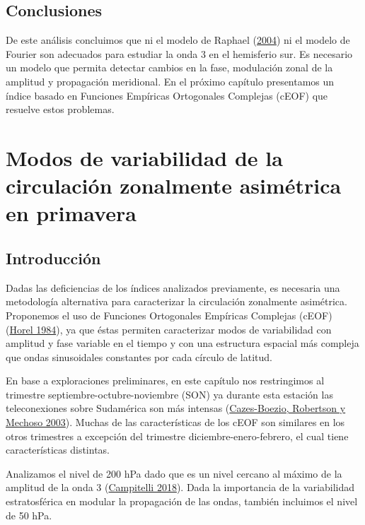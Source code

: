 \documentclass[12pt,oneside,a4paper]{reedthesis}
\begin{document}
\hypertarget{conclusiones}{%
\section{Conclusiones}\label{conclusiones}}

De este análisis concluimos que ni el modelo de Raphael (\protect\hyperlink{ref-raphael2004}{2004}) ni el modelo de Fourier son adecuados para estudiar la onda 3 en el hemisferio sur.
Es necesario un modelo que permita detectar cambios en la fase, modulación zonal de la amplitud y propagación meridional.
En el próximo capítulo presentamos un índice basado en Funciones Empíricas Ortogonales Complejas (cEOF) que resuelve estos problemas.

\hypertarget{ceofs}{%
\chapter{Modos de variabilidad de la circulación zonalmente asimétrica en primavera}\label{ceofs}}

\hypertarget{introducciuxf3n}{%
\section{Introducción}\label{introducciuxf3n}}

Dadas las deficiencias de los índices analizados previamente, es necesaria una metodología alternativa para caracterizar la circulación zonalmente asimétrica.
Proponemos el uso de Funciones Ortogonales Empíricas Complejas (cEOF) (\protect\hyperlink{ref-horel1984}{Horel 1984}), ya que éstas permiten caracterizar modos de variabilidad con amplitud y fase variable en el tiempo y con una estructura espacial más compleja que ondas sinusoidales constantes por cada círculo de latitud.

En base a exploraciones preliminares, en este capítulo nos restringimos al trimestre septiembre-octubre-noviembre (SON) ya durante esta estación las teleconexiones sobre Sudamérica son más intensas (\protect\hyperlink{ref-cazes-boezio2003}{Cazes-Boezio, Robertson y Mechoso 2003}).
Muchas de las características de los cEOF son similares en los otros trimestres a excepción del trimestre diciembre-enero-febrero, el cual tiene características distintas.

Analizamos el nivel de 200 hPa dado que es un nivel cercano al máximo de la amplitud de la onda 3 (\protect\hyperlink{ref-campitelli2018b}{Campitelli 2018}).
Dada la importancia de la variabilidad estratosférica en modular la propagación de las ondas, también incluimos el nivel de 50 hPa.
\end{document}
